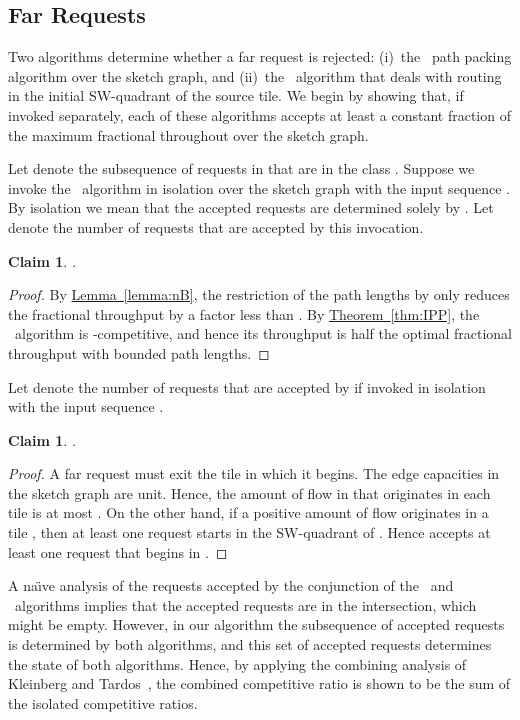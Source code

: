 \documentclass[11pt]{article}
\newtheorem{claim}[theorem]{Claim}
\newcommand{\namedref}[2]{\hyperref[#2]{#1~\ref*{#2}}}
\newcommand{\theoremref}[1]{\namedref{Theorem}{#1}}
\newcommand{\lemmaref}[1]{\namedref{Lemma}{#1}}
\newcommand{\route}{\text{\sc{ipp}}\xspace}
\newcommand{\IPP}{\route}
\newcommand{\initroute}{\text{\sc{initial-route}}\xspace}
\newenvironment{proof sketch}[1]{\noindent {\emph{Proof sketch of #1:}}}{\hfill \qed}
\begin{document}
\subsection{Far Requests}
Two algorithms determine whether a far request is rejected: (i)~the \IPP\ path
packing algorithm over the sketch graph, and (ii)~the \initroute\ algorithm that
deals with routing in the initial SW-quadrant of the source tile. We begin by showing
that, if invoked separately, each of these algorithms accepts at least a constant
fraction of the maximum fractional throughout over the sketch graph.

Let  denote the subsequence of requests in  that are in the class .
Suppose we invoke the \IPP\ algorithm in isolation over the sketch graph  with
the input sequence . By isolation we mean that the accepted requests are
determined solely by . Let  denote the number of requests
that are accepted by this invocation.
\begin{claim}\label{claim:IPP}
.
\end{claim}
\begin{proof}
  By \lemmaref{lemma:nB}, the restriction of the path lengths by  only reduces
  the fractional throughput by a factor less than .  By \theoremref{thm:IPP}, the \IPP\
  algorithm is -competitive, and hence its throughput is half the optimal
  fractional throughput with bounded path lengths.
\end{proof}

Let  denote the number of requests
that are accepted by  if invoked in isolation with
the input sequence .
\begin{claim}\label{claim:init}
.
\end{claim}
\begin{proof}
  A far request must exit the tile in which it begins.  The edge capacities in the
  sketch graph are unit. Hence, the amount of flow in  that
  originates in each tile is at most .  On the other hand, if a positive amount of
  flow originates in a tile , then at least one request starts in the SW-quadrant
  of . Hence  accepts at least one request that begins in .
\end{proof}

A na\"{\i}ve analysis of the requests accepted by the
conjunction of the \IPP\ and \initroute\ algorithms implies
that the accepted requests are in the intersection, which
might be empty. However, in our algorithm the subsequence
of accepted requests is determined by both algorithms, and
this set of accepted requests determines the state of both
algorithms. Hence, by applying the combining analysis of
Kleinberg and Tardos~\cite{KT}, the combined competitive
ratio is shown to be the sum of the isolated competitive
ratios.
\end{document}
